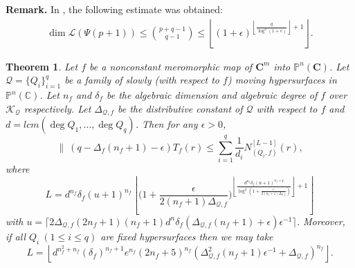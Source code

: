 \documentclass[12pt,leqno]{amsart}
\newtheorem{theorem}[equation]{Theorem}
\newcommand{\C}{{\mathbb{C}}}
\renewcommand{\P}{{\mathbb{P}}}
\numberwithin{equation}{section}
\begin{document}
\noindent
{\bf Remark.} In \cite{QT10}, the following estimate was obtained:
\begin{align}\label{4.1}
\dim\mathcal L(\Psi(p+1))\le\binom{p+q-1}{q-1}\le\left\lfloor(1+\epsilon)^{\left\lfloor\frac{q}{\log^2(1+\epsilon)}\right\rfloor+1}\right\rfloor.
\end{align}

\begin{theorem}\label{main}  
Let $f$ be a nonconstant meromorphic map of $\mathbf{C}^m$ into $\P^n(\mathbf{C})$. Let $\mathcal Q=\{Q_i\}_{i=1}^q$ be a family of slowly (with respect to $f$) moving hypersurfaces in $\P^n(\C)$. Let $n_f$ and $\delta_f$ be the algebraic dimension and algebraic degree of $f$ over $\mathcal K_{\mathcal Q}$ respectively.  Let $\Delta_{\mathcal Q,f}$ be the distributive constant of $\mathcal Q$ with respect to $f$ and $d=lcm(\deg Q_1,\ldots,\deg Q_q)$. Then for any $\epsilon >0$, 
$$  \|\ (q-\Delta_f(n_f+1)-\epsilon)T_f(r)\le \sum_{i=1}^{q}\dfrac{1}{d_i}N^{[L-1]}_{(Q_i,f)}(r),$$
where 
$$L=d^{n_f}\delta_f(u+1)^{n_f}\left\lfloor\biggl(1+\frac{\epsilon}{2({n_f}+1)\Delta_{\mathcal Q,f}}\biggl)^{\left\lfloor\frac{d^{n_f}\delta_f(u+1)^{n_f+q}}{\log^2(1+\frac{\epsilon}{2(n_f+1)\Delta_{\mathcal Q,f}})}\right\rfloor+1}\right\rfloor$$
with $u=\lceil 2\Delta_{\mathcal Q,f}(2n_f+1)(n_f+1)d^n\delta_f(\Delta_{\mathcal Q,f}(n_f+1)+\epsilon)\epsilon^{-1}\rceil$. Moreover, if all $Q_i\ (1\le i\le q)$ are fixed hypersurfaces then we may take 
$$L=\left\lfloor d^{n^2_f+n_f}(\delta_f)^{n_f+1}e^{n_f}(2n_f+5)^{n_f}(\Delta^2_{\mathcal Q,f}(n_f+1)\epsilon^{-1}+\Delta_{\mathcal Q,f})^{n_f}\right\rfloor.$$
\end{theorem}
\end{document}
